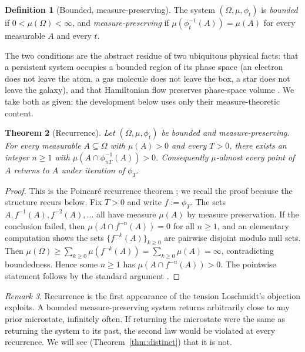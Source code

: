 \documentclass[11pt,a4paper]{article}
\theoremstyle{thmstyle}
\newtheorem{theorem}{Theorem}[section]
\theoremstyle{definition}
\newtheorem{definition}[theorem]{Definition}
\theoremstyle{remark}
\newtheorem{remark}[theorem]{Remark}
\newcommand{\flow}{\phi}
\begin{document}
\begin{definition}[Bounded, measure-preserving]
\label{def:boundedmp}
The system $(\Omega,\mu,\flow_t)$ is \emph{bounded} if
$0<\mu(\Omega)<\infty$, and \emph{measure-preserving} if
$\mu(\flow_t^{-1}(A))=\mu(A)$ for every measurable $A$ and every $t$.
\end{definition}

The two conditions are the abstract residue of two ubiquitous physical
facts: that a persistent system occupies a bounded region of its phase
space (an electron does not leave the atom, a gas molecule does not leave
the box, a star does not leave the galaxy), and that Hamiltonian flow
preserves phase-space volume \citep{liouville1838}. We take both as
given; the development below uses only their measure-theoretic content.

\begin{theorem}[Recurrence]
\label{thm:recurrence}
Let $(\Omega,\mu,\flow_t)$ be bounded and measure-preserving. For every
measurable $A\subseteq\Omega$ with $\mu(A)>0$ and every $T>0$, there
exists an integer $n\geq 1$ with $\mu(A\cap\flow_{nT}^{-1}(A))>0$.
Consequently $\mu$-almost every point of $A$ returns to $A$ under
iteration of $\flow_T$.
\end{theorem}

\begin{proof}
This is the Poincar\'e recurrence theorem \citep{poincare1890}; we recall
the proof because the structure recurs below. Fix $T>0$ and write
$f:=\flow_T$. The sets $A,f^{-1}(A),f^{-2}(A),\dots$ all have measure
$\mu(A)$ by measure preservation. If the conclusion failed, then
$\mu(A\cap f^{-n}(A))=0$ for all $n\geq 1$, and an elementary computation
shows the sets $\{f^{-k}(A)\}_{k\geq 0}$ are pairwise disjoint modulo
null sets. Then
$\mu(\Omega)\geq\sum_{k\geq 0}\mu(f^{-k}(A))=\sum_{k\geq 0}\mu(A)=\infty$,
contradicting boundedness. Hence some $n\geq 1$ has
$\mu(A\cap f^{-n}(A))>0$. The pointwise statement follows by the standard
argument \citep{walters1982}.
\end{proof}

\begin{remark}
\label{rem:recurrence}
Recurrence is the first appearance of the tension Loschmidt's objection
exploits. A bounded measure-preserving system returns arbitrarily close
to any prior microstate, infinitely often. If returning the microstate
were the same as returning the system to its past, the second law would
be violated at every recurrence. We will see (Theorem~\ref{thm:distinct})
that it is not.
\end{remark}
\end{document}
